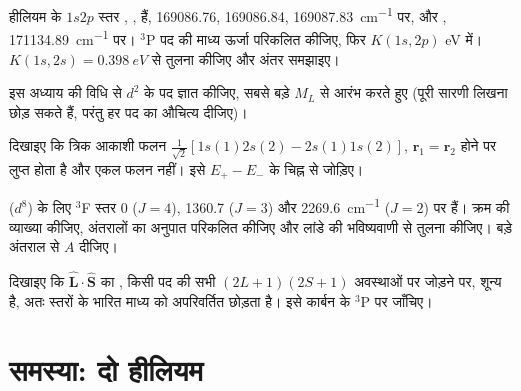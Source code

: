 \begin{exercise}[$\star\star$]\label{exo:b3:many-electron-atoms:8}
हीलियम के $1s2p$ स्तर , ,
 हैं, 169086.76, 169086.84, \qty{169087.83}{cm^{-1}} पर, और
, \qty{171134.89}{cm^{-1}} पर। ${}^3$P पद की माध्य ऊर्जा
परिकलित कीजिए, फिर $K(1s,2p)$ eV में। $K(1s,2s) = \qty{0.398}{eV}$ से तुलना कीजिए
और अंतर समझाइए।
\end{exercise}

\begin{exercise}[$\star\star$]\label{exo:b3:many-electron-atoms:9}
इस अध्याय की विधि से $d^2$ के पद ज्ञात कीजिए, सबसे बड़े $M_L$ से
आरंभ करते हुए (पूरी सारणी लिखना छोड़ सकते हैं, परंतु हर पद का औचित्य दीजिए)।
\end{exercise}

\begin{exercise}[$\star\star\star$]\label{exo:b3:many-electron-atoms:10}
दिखाइए कि त्रिक आकाशी फलन $\frac{1}{\sqrt2}[1s(1)2s(2) -
2s(1)1s(2)]$, $\mathbf r_1 = \mathbf r_2$ होने पर लुप्त होता है और एकल
फलन नहीं। इसे $E_+ - E_-$ के चिह्न से जोड़िए।
\end{exercise}

\begin{exercise}[$\star\star\star$]\label{exo:b3:many-electron-atoms:11}
 ($d^8$) के लिए ${}^3$F स्तर 0 ($J = 4$), 1360.7 ($J = 3$)
और \qty{2269.6}{cm^{-1}} ($J = 2$) पर हैं। क्रम की व्याख्या कीजिए, अंतरालों का
अनुपात परिकलित कीजिए और लांडे की भविष्यवाणी से तुलना कीजिए। बड़े अंतराल से
$A$ दीजिए।
\end{exercise}

\begin{exercise}[$\star\star\star$]\label{exo:b3:many-electron-atoms:12}
दिखाइए कि $\hat{\mathbf L}\cdot\hat{\mathbf S}$ का , किसी पद की
सभी $(2L+1)(2S+1)$ अवस्थाओं पर जोड़ने पर, शून्य है, अतः  स्तरों के भारित माध्य को अपरिवर्तित छोड़ता है। इसे
कार्बन के ${}^3$P पर जाँचिए।
\end{exercise}

\section{समस्या: दो हीलियम}

